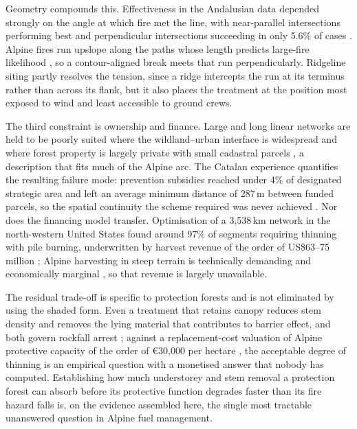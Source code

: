 \documentclass[11pt,a4paper]{article}
\begin{document}
Geometry compounds this. Effectiveness in the Andalusian data depended strongly on the angle at which fire met the line, with near-parallel intersections performing best and perpendicular intersections succeeding in only 5.6\% of cases \citep{ortega_modeling_2024}. Alpine fires run upslope along the paths whose length predicts large-fire likelihood \citep{conedera_linking_2024}, so a contour-aligned break meets that run perpendicularly. Ridgeline siting \citep{ascoli_firebreak_2018} partly resolves the tension, since a ridge intercepts the run at its terminus rather than across its flank, but it also places the treatment at the position most exposed to wind and least accessible to ground crews.

The third constraint is ownership and finance. Large and long linear networks are held to be poorly suited where the wildland--urban interface is widespread and where forest property is largely private with small cadastral parcels \citep{ascoli_firebreak_2018}, a description that fits much of the Alpine arc. The Catalan experience quantifies the resulting failure mode: prevention subsidies reached under 4\% of designated strategic area and left an average minimum distance of 287\,m between funded parcels, so the spatial continuity the scheme required was never achieved \citep{gorrizmifsud_current_2026}. Nor does the financing model transfer. Optimisation of a 3{,}538\,km network in the north-western United States found around 97\% of segments requiring thinning with pile burning, underwritten by harvest revenue of the order of US\$63--75 million \citep{ager_optimizing_2023}; Alpine harvesting in steep terrain is technically demanding and economically marginal \citep{dinca_timber_2025}, so that revenue is largely unavailable.

The residual trade-off is specific to protection forests and is not eliminated by using the shaded form. Even a treatment that retains canopy reduces stem density and removes the lying material that contributes to barrier effect, and both govern rockfall arrest \citep{costa_biological_2021, moos_climate_2021}; against a replacement-cost valuation of Alpine protective capacity of the order of €30{,}000 per hectare \citep{accastello_asforesee_2019}, the acceptable degree of thinning is an empirical question with a monetised answer that nobody has computed. Establishing how much understorey and stem removal a protection forest can absorb before its protective function degrades faster than its fire hazard falls is, on the evidence assembled here, the single most tractable unanswered question in Alpine fuel management.
\end{document}
